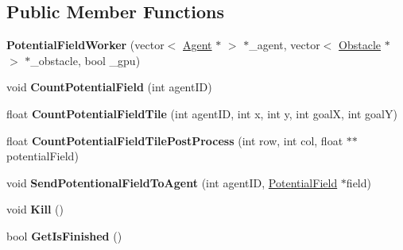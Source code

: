 \subsection*{Public Member Functions}
\begin{DoxyCompactItemize}
\item 
\hypertarget{class_potential_field_worker_a3c8744a10a2b6eea3f89d2b2e1b175d7}{{\bfseries Potential\-Field\-Worker} (vector$<$ \hyperlink{class_agent}{Agent} $\ast$ $>$ $\ast$\-\_\-agent, vector$<$ \hyperlink{class_obstacle}{Obstacle} $\ast$ $>$ $\ast$\-\_\-obstacle, bool \-\_\-gpu)}\label{class_potential_field_worker_a3c8744a10a2b6eea3f89d2b2e1b175d7}

\item 
\hypertarget{class_potential_field_worker_af199a1a56da40d6d91dac6ace59b91d6}{void {\bfseries Count\-Potential\-Field} (int agent\-I\-D)}\label{class_potential_field_worker_af199a1a56da40d6d91dac6ace59b91d6}

\item 
\hypertarget{class_potential_field_worker_a817c39e54702fcc554cf3d6d53a091ba}{float {\bfseries Count\-Potential\-Field\-Tile} (int agent\-I\-D, int x, int y, int goal\-X, int goal\-Y)}\label{class_potential_field_worker_a817c39e54702fcc554cf3d6d53a091ba}

\item 
\hypertarget{class_potential_field_worker_a15cf6a37f30c755eb9873c23105dd4fb}{float {\bfseries Count\-Potential\-Field\-Tile\-Post\-Process} (int row, int col, float $\ast$$\ast$potential\-Field)}\label{class_potential_field_worker_a15cf6a37f30c755eb9873c23105dd4fb}

\item 
\hypertarget{class_potential_field_worker_a44cedc70fe79f55a8ac8be2af98e2951}{void {\bfseries Send\-Potentional\-Field\-To\-Agent} (int agent\-I\-D, \hyperlink{class_potential_field}{Potential\-Field} $\ast$field)}\label{class_potential_field_worker_a44cedc70fe79f55a8ac8be2af98e2951}

\item 
\hypertarget{class_potential_field_worker_aacbaf877324d41822f30299c4a62b2b0}{void {\bfseries Kill} ()}\label{class_potential_field_worker_aacbaf877324d41822f30299c4a62b2b0}

\item 
\hypertarget{class_potential_field_worker_aacdf2ba9347c1d495bb73201c7cdc67e}{bool {\bfseries Get\-Is\-Finished} ()}\label{class_potential_field_worker_aacdf2ba9347c1d495bb73201c7cdc67e}


\end{DoxyCompactItemize}
